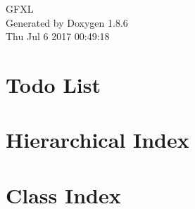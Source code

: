 \documentclass[twoside]{book}
\newcommand{\clearemptydoublepage}{%
  \newpage{\pagestyle{empty}\cleardoublepage}%
}
\begin{document}
\hypersetup{pageanchor=false}
\begin{titlepage}
\vspace*{7cm}
\begin{center}%
{\Large G\-F\-X\-L }\\
\vspace*{1cm}
{\large Generated by Doxygen 1.8.6}\\
\vspace*{0.5cm}
{\small Thu Jul 6 2017 00:49:18}\\
\end{center}
\end{titlepage}
\clearemptydoublepage
\tableofcontents
\clearemptydoublepage
{}
\hypersetup{pageanchor=true}

\chapter{Todo List}
\label{todo}
\hypertarget{todo}{}

\chapter{Hierarchical Index}

\chapter{Class Index}

\end{document}
